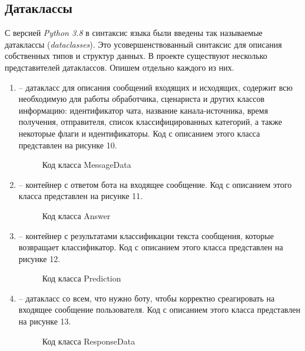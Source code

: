     \subsection{Датаклассы}
    С версией \textit{Python 3.8} в синтаксис языка были введены так называемые
    датаклассы (\textit{dataclasses}).
    Это усовершенствованный синтаксис для описания собственных типов и структур данных.
    В проекте существуют несколько представителей датаклассов. Опишем отдельно каждого из них.
    \begin{enumerate}
        \item {} -- датакласс для описания сообщений входящих и исходящих,
        содержит всю необходимую для работы обработчика, сценариста и других классов информацию:
        идентификатор чата, название канала-источника, время получения, отправителя,
        список классифицированных категорий, а также некоторые флаги и идентификаторы.
        Код с описанием этого класса представлен на рисунке 10.

        \begin{figure}[H]
            \centering
            
            \caption{Код класса MessageData}
            \label{fig:messagedata}
        \end{figure}

        \item {} -- контейнер с ответом бота на входящее сообщение.
        Код с описанием этого класса представлен на рисунке 11.

        \begin{figure}[H]
            \centering
            
            \caption{Код класса Answer}
            \label{fig:answer}
        \end{figure}

        \item {} -- контейнер с результатами классификации текста сообщения,
        которые возвращает классификатор.
        Код с описанием этого класса представлен на рисунке 12.

        \begin{figure}[H]
            \centering
            
            \caption{Код класса Prediction}
            \label{fig:prediction}
        \end{figure}

        \item {} -- датакласс со всем, что нужно боту, чтобы корректно
        среагировать на входящее сообщение пользователя.
        Код с описанием этого класса представлен на рисунке 13.

        \begin{figure}[H]
            \centering
            
            \caption{Код класса ResponseData}
            \label{fig:responsedata}
        \end{figure}

    \end{enumerate}

